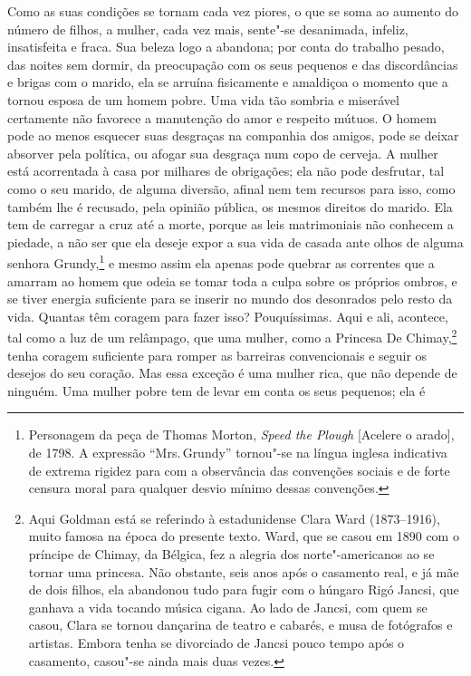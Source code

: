 Como as suas condições se tornam cada vez piores, o que se soma ao
aumento do número de filhos, a mulher, cada vez mais, sente"-se
desanimada, infeliz, insatisfeita e fraca. Sua beleza logo a abandona;
por conta do trabalho pesado, das noites sem dormir, da preocupação com
os seus pequenos e das discordâncias e brigas com o marido, ela se
arruína fisicamente e amaldiçoa o momento que a tornou esposa de um
homem pobre. Uma vida tão sombria e miserável certamente não favorece a
manutenção do amor e respeito mútuos. O homem pode ao menos esquecer
suas desgraças na companhia dos amigos, pode se deixar absorver pela
política, ou afogar sua desgraça num copo de cerveja. A mulher está
acorrentada à casa por milhares de obrigações; ela não pode desfrutar,
tal como o seu marido, de alguma diversão, afinal nem tem recursos para
isso, como também lhe é recusado, pela opinião pública, os mesmos
direitos do marido. Ela tem de carregar a cruz até a morte, porque as
leis matrimoniais não conhecem a piedade, a não ser que ela deseje expor
a sua vida de casada ante olhos de alguma senhora Grundy,\footnote{Personagem
  da peça de Thomas Morton, \emph{Speed the Plough} {[}Acelere o
  arado{]}, de 1798. A expressão ``Mrs.\,Grundy'' tornou"-se na língua
  inglesa indicativa de extrema rigidez para com a observância das
  convenções sociais e de forte censura moral para qualquer desvio
  mínimo dessas convenções.} e mesmo assim ela apenas pode quebrar as
correntes que a amarram ao homem que odeia se tomar toda a culpa
sobre os próprios ombros, e se tiver energia suficiente para se inserir
no mundo dos desonrados pelo resto da vida. Quantas têm coragem para
fazer isso? Pouquíssimas. Aqui e ali, acontece, tal como a luz de um
relâmpago, que uma mulher, como a Princesa De Chimay,\footnote{Aqui Goldman está se referindo à estadunidense Clara Ward (1873--1916), muito famosa na época do presente texto. Ward, que se casou em 1890 com o príncipe de Chimay, da Bélgica, fez a alegria dos norte"-americanos ao se tornar uma princesa. Não obstante, seis anos após o casamento real, e já mãe de dois filhos, ela abandonou tudo para fugir com o húngaro Rigó Jancsi, que ganhava a vida tocando música cigana. Ao lado de Jancsi, com quem se casou, Clara se tornou dançarina de teatro e cabarés, e musa de fotógrafos e artistas. Embora tenha se divorciado de Jancsi pouco tempo após o casamento, casou"-se ainda mais duas vezes.} tenha coragem
suficiente para romper as barreiras convencionais e seguir os desejos do
seu coração. Mas essa exceção é uma mulher rica, que não depende de
ninguém. Uma mulher pobre tem de levar em conta os seus pequenos; ela é
